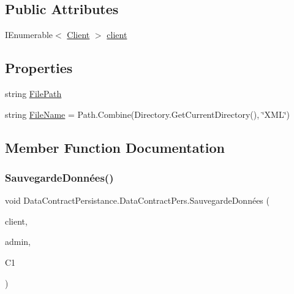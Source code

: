 \subsection*{Public Attributes}
\begin{DoxyCompactItemize}
\item 
I\+Enumerable$<$ \hyperlink{classModele_1_1Client}{Client} $>$ \hyperlink{classDataContractPersistance_1_1DataContractPers_a397297f0e263edc3771ed782292666ae}{client}
\end{DoxyCompactItemize}
\subsection*{Properties}
\begin{DoxyCompactItemize}
\item 
string \hyperlink{classDataContractPersistance_1_1DataContractPers_ad82c0f6387b133099f996fe0f05e24ce}{File\+Path}
\item 
string \hyperlink{classDataContractPersistance_1_1DataContractPers_a172cb757062bfbe80c8dfdca16fc368c}{File\+Name} = Path.\+Combine(Directory.\+Get\+Current\+Directory(), \char`\"{}X\+ML\char`\"{})
\end{DoxyCompactItemize}


\subsection{Member Function Documentation}
\mbox{\label{classDataContractPersistance_1_1DataContractPers_aa2ef70839fd63f14fab9aca02bd42528}} 
\subsubsection{\texorpdfstring{Sauvegarde\+Données()}{SauvegardeDonnées()}}
{\footnotesize\ttfamily void Data\+Contract\+Persistance.\+Data\+Contract\+Pers.\+Sauvegarde\+Données (\begin{DoxyParamCaption}\item[{I\+Enumerable$<$ \hyperlink{classModele_1_1Client}{Client} $>$}]{client,  }\item[{I\+Enumerable$<$ \hyperlink{classModele_1_1Administrateur}{Administrateur} $>$}]{admin,  }\item[{\hyperlink{classModele_1_1Catalogue}{Catalogue}}]{C1 }\end{DoxyParamCaption})\hspace{0.3cm}{\ttfamily [inline]}}



